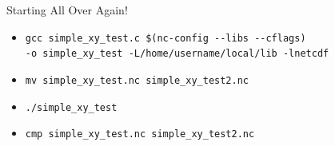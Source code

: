 \documentclass[compress,11pt,xcolor=svgnames,aspectratio=169]{beamer}
\begin{document}
\begin{frame}[fragile]{Starting All Over Again!}

\begin{itemize}
  \setlength\itemsep{0.5cm}

  \item \verb|gcc simple_xy_test.c $(nc-config --libs --cflags)|\\
  \verb|-o simple_xy_test -L/home/username/local/lib -lnetcdf|
  \item \verb|mv simple_xy_test.nc simple_xy_test2.nc|
  \item \verb|./simple_xy_test|
  \item \verb|cmp simple_xy_test.nc simple_xy_test2.nc|

\end{itemize}

\end{frame}
\end{document}
